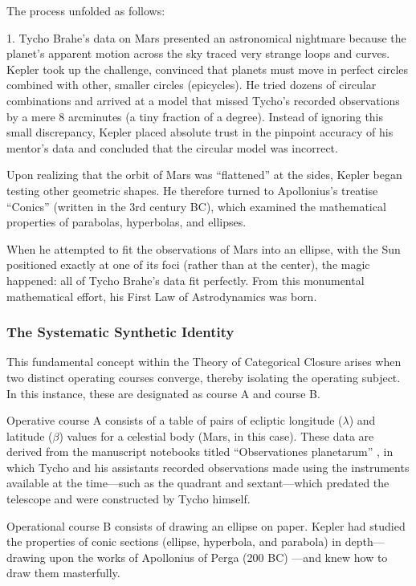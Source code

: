 \documentclass[11pt, a4paper]{article}
\begin{document}
The process unfolded as follows:

1. Tycho Brahe’s data on Mars presented an astronomical nightmare because the planet's apparent motion across the sky traced very strange loops and curves. Kepler took up the challenge, convinced that planets must move in perfect circles combined with other, smaller circles (epicycles). He tried dozens of circular combinations and arrived at a model that missed Tycho’s recorded observations by a mere 8 arcminutes (a tiny fraction of a degree). Instead of ignoring this small discrepancy, Kepler placed absolute trust in the pinpoint accuracy of his mentor's data and concluded that the circular model was incorrect.

Upon realizing that the orbit of Mars was ``flattened'' at the sides, Kepler began testing other geometric shapes. He therefore turned to Apollonius's treatise ``Conics'' (written in the 3rd century BC), which examined the mathematical properties of parabolas, hyperbolas, and ellipses.

When he attempted to fit the observations of Mars into an ellipse, with the Sun positioned exactly at one of its foci (rather than at the center), the magic happened: all of Tycho Brahe's data fit perfectly. From this monumental mathematical effort, his First Law of Astrodynamics was born.


\subsubsection*{The Systematic Synthetic Identity}

This fundamental concept within the Theory of Categorical Closure arises when two distinct operating courses converge, thereby isolating the operating subject. In this instance, these are designated as course A and course B.

Operative course A consists of a table of pairs of ecliptic longitude ($\lambda$) and latitude  ($\beta$) values for a celestial body (Mars, in this case).
These data are derived from the manuscript notebooks titled ``Observationes planetarum'' \cite{brahe1596observationes}, in which Tycho and his assistants recorded observations made using the instruments available at the time—such as the quadrant and sextant—which predated the telescope and were constructed by Tycho himself.

Operational course B consists of drawing an ellipse on paper. Kepler had studied the properties of conic sections (ellipse, hyperbola, and parabola) in depth—drawing upon the works of Apollonius of Perga (200 BC) \cite{apollonius1566conicorum}—and knew how to draw them masterfully.
\end{document}
